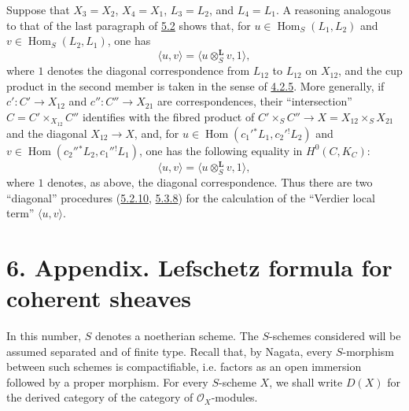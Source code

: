\documentclass[11pt]{article}
\providecommand{\cO}{\mathcal{O}}
\DeclareMathOperator{\Hom}{Hom}
\providecommand{\Hom}{\operatorname{Hom}}
\providecommand{\Hom}{\operatorname{Hom}}
\begin{document}
Suppose that $X_3=X_2$, $X_4=X_1$, $L_3=L_2$, and $L_4=L_1$. A reasoning analogous to that of the last paragraph of \hyperref[sga5:III:subsection:5.2]{5.2} shows that, for $u\in\Hom_S(L_1,L_2)$ and $v\in\Hom_S(L_2,L_1)$, one has
\begin{equation}
\tag{5.3.7}\label{sga5:III:equation:5.3.7}
\langle u,v\rangle=\langle u\otimes_S^{\mathbf L}v,1\rangle,
\end{equation}
where $1$ denotes the diagonal correspondence from $L_{12}$ to $L_{12}$ on $X_{12}$, and the cup product in the second member is taken in the sense of \hyperref[sga5:III:equation:4.2.5]{4.2.5}. More generally, if $c':C'\to X_{12}$ and $c'':C''\to X_{21}$ are correspondences, their ``intersection'' $C=C'\times_{X_{12}}C''$ identifies with the fibred product of $C'\times_SC''\to X=X_{12}\times_SX_{21}$ and the diagonal $X_{12}\to X$, and, for $u\in\Hom(c_1'{}^*L_1,c_2'{}^!L_2)$ and $v\in\Hom(c_2''{}^*L_2,c_1''{}^!L_1)$, one has the following equality in $H^0(C,K_C)$:
\begin{equation}
\tag{5.3.8}\label{sga5:III:equation:5.3.8}
\langle u,v\rangle=\langle u\otimes_S^{\mathbf L}v,1\rangle,
\end{equation}
where $1$ denotes, as above, the diagonal correspondence. Thus there are two ``diagonal'' procedures (\hyperref[sga5:III:equation:5.2.10]{5.2.10}, \hyperref[sga5:III:equation:5.3.8]{5.3.8}) for the calculation of the ``Verdier local term'' $\langle u,v\rangle$.

\section*{6. Appendix. Lefschetz formula for coherent sheaves}\label{sga5:III:section:6}

In this number, $S$ denotes a noetherian scheme. The $S$-schemes considered will be assumed separated and of finite type. Recall that, by Nagata, every $S$-morphism between such schemes is compactifiable, i.e. factors as an open immersion followed by a proper morphism. For every $S$-scheme $X$, we shall write $D(X)$ for the derived category of the category of $\cO_X$-modules.
\end{document}
